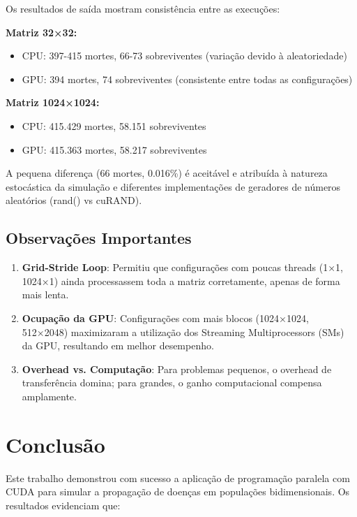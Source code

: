 \documentclass{article}
\begin{document}
Os resultados de saída mostram consistência entre as execuções:

\textbf{Matriz 32×32:}
\begin{itemize}
    \item CPU: 397-415 mortes, 66-73 sobreviventes (variação devido à aleatoriedade)
    \item GPU: 394 mortes, 74 sobreviventes (consistente entre todas as configurações)
\end{itemize}

\textbf{Matriz 1024×1024:}
\begin{itemize}
    \item CPU: 415.429 mortes, 58.151 sobreviventes
    \item GPU: 415.363 mortes, 58.217 sobreviventes
\end{itemize}

A pequena diferença (66 mortes, 0.016\%) é aceitável e atribuída à natureza estocástica da simulação e diferentes implementações de geradores de números aleatórios (rand() vs cuRAND).

\subsection{Observações Importantes}

\begin{enumerate}
    \item \textbf{Grid-Stride Loop}: Permitiu que configurações com poucas threads (1×1, 1024×1) ainda processassem toda a matriz corretamente, apenas de forma mais lenta.
    
    \item \textbf{Ocupação da GPU}: Configurações com mais blocos (1024×1024, 512×2048) maximizaram a utilização dos Streaming Multiprocessors (SMs) da GPU, resultando em melhor desempenho.
    
    \item \textbf{Overhead vs. Computação}: Para problemas pequenos, o overhead de transferência domina; para grandes, o ganho computacional compensa amplamente.
\end{enumerate}

\section{Conclusão}

Este trabalho demonstrou com sucesso a aplicação de programação paralela com CUDA para simular a propagação de doenças em populações bidimensionais. Os resultados evidenciam que:
\end{document}
